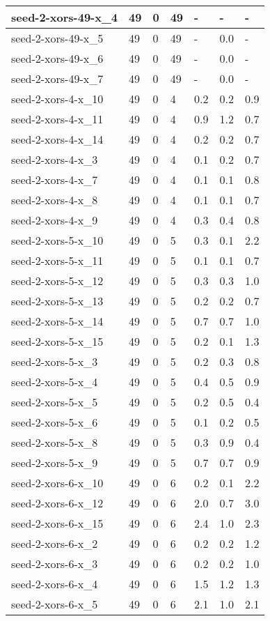 \begin{scriptsize}
\begin{longtable}{|p{5cm}|l|l|l|l|l|l|}
seed-2-xors-49-x\_4&49&0&49&-&-&- \\ \hline 
seed-2-xors-49-x\_5&49&0&49&-&0.0&- \\ \hline 
seed-2-xors-49-x\_6&49&0&49&-&0.0&- \\ \hline 
seed-2-xors-49-x\_7&49&0&49&-&0.0&- \\ \hline 
seed-2-xors-4-x\_10&49&0&4&0.2&0.2&0.9 \\ \hline 
seed-2-xors-4-x\_11&49&0&4&0.9&1.2&0.7 \\ \hline 
seed-2-xors-4-x\_14&49&0&4&0.2&0.2&0.7 \\ \hline 
seed-2-xors-4-x\_3&49&0&4&0.1&0.2&0.7 \\ \hline 
seed-2-xors-4-x\_7&49&0&4&0.1&0.1&0.8 \\ \hline 
seed-2-xors-4-x\_8&49&0&4&0.1&0.1&0.7 \\ \hline 
seed-2-xors-4-x\_9&49&0&4&0.3&0.4&0.8 \\ \hline 
seed-2-xors-5-x\_10&49&0&5&0.3&0.1&2.2 \\ \hline 
seed-2-xors-5-x\_11&49&0&5&0.1&0.1&0.7 \\ \hline 
seed-2-xors-5-x\_12&49&0&5&0.3&0.3&1.0 \\ \hline 
seed-2-xors-5-x\_13&49&0&5&0.2&0.2&0.7 \\ \hline 
seed-2-xors-5-x\_14&49&0&5&0.7&0.7&1.0 \\ \hline 
seed-2-xors-5-x\_15&49&0&5&0.2&0.1&1.3 \\ \hline 
seed-2-xors-5-x\_3&49&0&5&0.2&0.3&0.8 \\ \hline 
seed-2-xors-5-x\_4&49&0&5&0.4&0.5&0.9 \\ \hline 
seed-2-xors-5-x\_5&49&0&5&0.2&0.5&0.4 \\ \hline 
seed-2-xors-5-x\_6&49&0&5&0.1&0.2&0.5 \\ \hline 
seed-2-xors-5-x\_8&49&0&5&0.3&0.9&0.4 \\ \hline 
seed-2-xors-5-x\_9&49&0&5&0.7&0.7&0.9 \\ \hline 
seed-2-xors-6-x\_10&49&0&6&0.2&0.1&2.2 \\ \hline 
seed-2-xors-6-x\_12&49&0&6&2.0&0.7&3.0 \\ \hline 
seed-2-xors-6-x\_15&49&0&6&2.4&1.0&2.3 \\ \hline 
seed-2-xors-6-x\_2&49&0&6&0.2&0.2&1.2 \\ \hline 
seed-2-xors-6-x\_3&49&0&6&0.2&0.2&1.0 \\ \hline 
seed-2-xors-6-x\_4&49&0&6&1.5&1.2&1.3 \\ \hline 
seed-2-xors-6-x\_5&49&0&6&2.1&1.0&2.1 \\ \hline 

\end{longtable}
\end{scriptsize}
